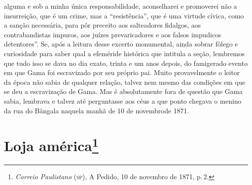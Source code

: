 \begin{argumento}
{alguma e sob a minha única responsabilidade, aconselharei e promoverei
não a insurreição, que é um crime, mas a ``resistência'', que é uma
virtude cívica, como a sanção necessária, para pôr preceito aos
salteadores fidalgos, aos contrabandistas impuros, aos juízes
prevaricadores e aos falsos impudicos detentores''. Se, após a leitura
desse excerto monumental, ainda sobrar fôlego e curiosidade para saber
qual a efeméride histórica que intitula a seção, lembremos que tudo isso
se dava no dia exato, trinta e um anos depois, do famigerado evento em
que Gama foi escravizado por seu próprio pai. Muito provavelmente o
leitor da época não sabia de qualquer relação, talvez nem mesmo das
condições em que se deu a escravização de Gama. Mas é absolutamente fora
de questão que Gama sabia, lembrava e talvez até perguntasse aos céus a
que ponto chegava o menino da rua do Bângala naquela manhã de 10 de
novembrode 1871.}
\end{argumento}

\chapter{Loja américa\footnote{\emph{Correio Paulistano} (\textsc{sp}), A Pedido, 10 de novembro de 1871,
  p.\,2.}} %

